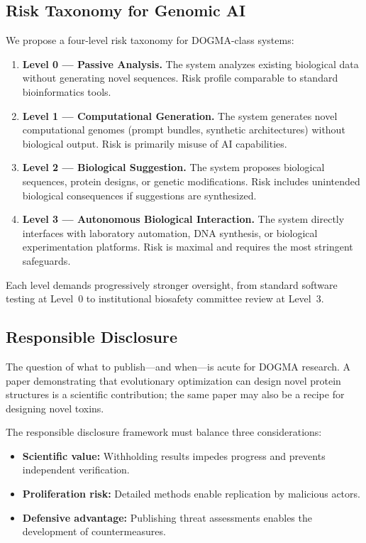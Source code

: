 \subsection{Risk Taxonomy for Genomic AI}

We propose a four-level risk taxonomy for DOGMA-class systems:

\begin{dogmadef}
\begin{enumerate}[leftmargin=1.5em]
  \item \textbf{Level 0 --- Passive Analysis.} The system analyzes existing biological data without generating novel sequences. Risk profile comparable to standard bioinformatics tools.
  \item \textbf{Level 1 --- Computational Generation.} The system generates novel computational genomes (prompt bundles, synthetic architectures) without biological output. Risk is primarily misuse of AI capabilities.
  \item \textbf{Level 2 --- Biological Suggestion.} The system proposes biological sequences, protein designs, or genetic modifications. Risk includes unintended biological consequences if suggestions are synthesized.
  \item \textbf{Level 3 --- Autonomous Biological Interaction.} The system directly interfaces with laboratory automation, DNA synthesis, or biological experimentation platforms. Risk is maximal and requires the most stringent safeguards.
\end{enumerate}
\end{dogmadef}

Each level demands progressively stronger oversight, from standard software testing at Level~0 to institutional biosafety committee review at Level~3.

\subsection{Responsible Disclosure}

The question of what to publish---and when---is acute for DOGMA research.
A paper demonstrating that evolutionary optimization can design novel protein structures is a scientific contribution; the same paper may also be a recipe for designing novel toxins.

The responsible disclosure framework must balance three considerations:
\begin{itemize}[leftmargin=1.5em]
  \item \textbf{Scientific value:} Withholding results impedes progress and prevents independent verification.
  \item \textbf{Proliferation risk:} Detailed methods enable replication by malicious actors.
  \item \textbf{Defensive advantage:} Publishing threat assessments enables the development of countermeasures.
\end{itemize}

